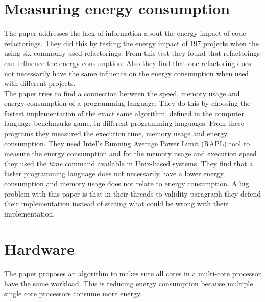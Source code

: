 \section{Measuring energy consumption}
The paper \cite{sahin2014code} addresses the lack of information about the energy impact of code refactorings. They did this by testing the energy impact of 197 projects when the using six commonly used refactorings. From this test they found that refactorings can influence the energy consumption. Also they find that one refactoring does not necessarily have the same influence on the energy consumption when used with different projects.\\

The paper \cite{pereira2017energy} tries to find a connection between the speed, memory usage and energy consumption of a programming language. They do this by choosing the fastest implementation of the exact same algorithm, defined in the computer language benchmarks game, in different programming languages. From these programs they measured the execution time, memory usage and energy consumption. They used Intel’s Running Average Power Limit (RAPL) tool to measure the energy consumption and for the memory usage and execution speed they used the \textit{time} command available in Unix-based systems. They find that a faster programming language does not necessarily have a lower energy consumption and memory usage does not relate to energy consumption. A big problem with this paper is that in their threads to validity paragraph they defend their implementation instead of stating what could be wrong with their implementation.\\

\section{Hardware}
The paper \cite{zakarya2013energy} proposes an algorithm to makes sure all cores in a multi-core processor have the same workload. This is reducing energy consumption because multiple single core processors consume more energy.\\

